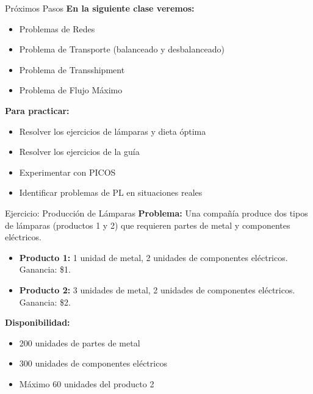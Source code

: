 \documentclass{beamer}
\begin{document}
\begin{frame}{Próximos Pasos}
    \textbf{En la siguiente clase veremos:}
    \begin{itemize}
        \item Problemas de Redes
        \item Problema de Transporte (balanceado y desbalanceado)
        \item Problema de Transshipment
        \item Problema de Flujo Máximo
    \end{itemize}
    
    \vspace{1em}
    \textbf{Para practicar:}
    \begin{itemize}
        \item Resolver los ejercicios de lámparas y dieta óptima
        \item Resolver los ejercicios de la guía
        \item Experimentar con PICOS
        \item Identificar problemas de PL en situaciones reales
    \end{itemize}
\end{frame}

\begin{frame}{Ejercicio: Producción de Lámparas}
    \textbf{Problema:}
    Una compañía produce dos tipos de lámparas (productos 1 y 2) que requieren partes de metal y componentes eléctricos.

    \begin{itemize}
        \item \textbf{Producto 1:} 1 unidad de metal, 2 unidades de componentes eléctricos. Ganancia: \$1.
        \item \textbf{Producto 2:} 3 unidades de metal, 2 unidades de componentes eléctricos. Ganancia: \$2.
    \end{itemize}
    
    \textbf{Disponibilidad:}
    \begin{itemize}
        \item 200 unidades de partes de metal
        \item 300 unidades de componentes eléctricos
        \item Máximo 60 unidades del producto 2
    \end{itemize}
\end{frame}
\end{document}
